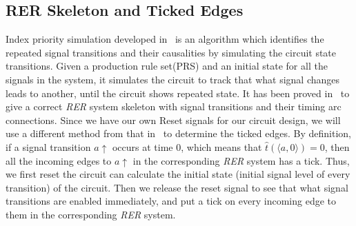 \documentclass[sigconf, 10pt, twocolumn]{acmart}
\begin{document}
\subsection{RER Skeleton and Ticked Edges}
Index priority simulation developed in~\cite{Lee:Analysis} is an algorithm which identifies the repeated signal transitions and their causalities by simulating the circuit state transitions. Given a production rule set(PRS) and an initial state for all the signals in the system, it simulates the circuit to track that what signal changes leads to another, until the circuit shows repeated state. It has been proved in~\cite{Lee:Analysis} to give a correct {\it RER\/} system skeleton with signal transitions and their timing arc connections. Since we have our own Reset signals for our circuit design, we will use a different method from that in~\cite{Lee:Analysis} to determine the ticked edges. By definition, if a signal transition $a\uparrow$ occurs at time 0, which means that $\hat{t}(\langle a, 0\rangle) = 0$, then all the incoming edges to $a\uparrow$ in the corresponding {\it RER\/} system has a tick. Thus, we first reset the circuit can calculate the initial state (initial signal level of every transition) of the circuit. Then we release the reset signal to see that what signal transitions are enabled immediately, and put a tick on every incoming edge to them in the corresponding {\it RER\/} system.
\end{document}
